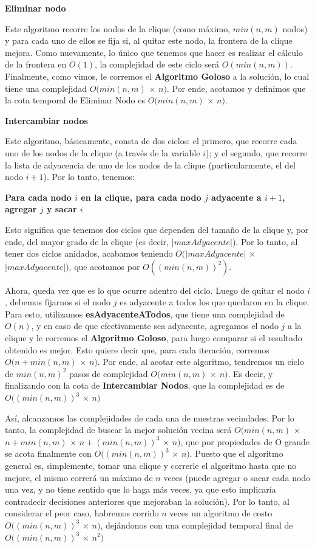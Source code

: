 \begin{center}
	\textbf{Eliminar nodo}
\end{center}
Este algoritmo recorre los nodos de la clique (como máximo, $min(n,m)$ nodos) y para cada uno de ellos se fija si, al quitar este nodo, la frontera de la clique mejora. Como nuevamente, lo único que tenemos que hacer es realizar el cálculo de la frontera en $O(1)$, la complejidad de este ciclo será $O(min(n,m))$. Finalmente, como vimos, le corremos el \textbf{Algoritmo Goloso} a la solución, lo cual tiene una complejidad $O(min(n,m)$ $\times$ $n)$. Por ende, acotamos y definimos que la cota temporal de Eliminar Nodo es $O(min(n,m)$ $\times$ $n)$.

\begin{center}
	\textbf{Intercambiar nodos}
\end{center}
Este algoritmo, básicamente, consta de dos ciclos: el primero, que recorre cada uno de los nodos de la clique (a través de la variable $i$); y el segundo, que recorre la lista de adyacencia de uno de los nodos de la clique (particularmente, el del nodo $i+1$). Por lo tanto, tenemos:

\textbf{Para cada nodo $i$ en la clique, para cada nodo $j$ adyacente a $i+1$, agregar $j$ y sacar $i$}

Esto significa que tenemos dos ciclos que dependen del tamaño de la clique y, por ende, del mayor grado de la clique (es decir, $|maxAdyacente|$). Por lo tanto, al tener dos ciclos anidados, acabamos teniendo $O(|maxAdyacente|$ $\times$ $|maxAdyacente|)$, que acotamos por $O((min(n,m))^2)$. 

Ahora, queda ver que es lo que ocurre adentro del ciclo. Luego de quitar el nodo $i$, debemos fijarnos si el nodo $j$ es adyacente a todos los que quedaron en la clique. Para esto, utilizamos \textbf{esAdyacenteATodos}, que tiene una complejidad de $O(n)$, y en caso de que efectivamente sea adyacente, agregamos el nodo $j$ a la clique y le corremos el \textbf{Algoritmo Goloso}, para luego comparar si el resultado obtenido es mejor. Esto quiere decir que, para cada iteración, corremos $O(n + min(n,m)$ $\times$ $n)$. Por ende, al acotar este algoritmo, tendremos un ciclo de $min(n,m)^2$ pasos de complejidad $O(min(n,m)$ $\times$ $n)$. Es decir, y finalizando con la cota de \textbf{Intercambiar Nodos}, que la complejidad es de $O((min(n,m))^3$ $\times$ $n)$

\bigskip

Así, alcanzamos las complejidades de cada una de nuestras vecindades. Por lo tanto, la complejidad de buscar la mejor solución vecina será $O(min(n,m)$ $\times$ $n + min(n,m)$ $\times$ $n + (min(n,m))^3$ $\times$ $n)$, que por propiedades de O grande se acota finalmente con $O((min(n,m))^3$ $\times$ $n)$. Puesto que el algoritmo general es, simplemente, tomar una clique y correrle el algoritmo hasta que no mejore, el mismo correrá un máximo de $n$ veces (puede agregar o sacar cada nodo una vez, y no tiene sentido que lo haga más veces, ya que esto implicaría contradecir decisiones anteriores que mejoraban la solución). Por lo tanto, al considerar el peor caso, habremos corrido $n$ veces un algoritmo de costo $O((min(n,m))^3$ $\times$ $n)$, dejándonos con una complejidad temporal final de $O((min(n,m))^3$ $\times$ $n^2)$

